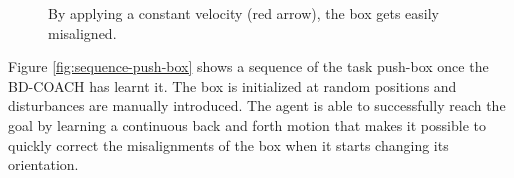  \begin{figure}[H]
  \centering
  \hspace*{\fill}%
   \hfill
   \hfill
   \hspace*{\fill}%
  \caption{By applying a constant velocity (red arrow), the box gets easily misaligned.}
  \label{fig:planar-motion-problem}
\end{figure}

Figure \ref{fig:sequence-push-box} shows a sequence of the task push-box once the BD-COACH has learnt it. The box is initialized at random positions and disturbances are manually introduced. The agent is able to successfully reach the goal by learning a continuous back and forth motion that makes it possible to quickly correct the misalignments of the box when it starts changing its orientation.

